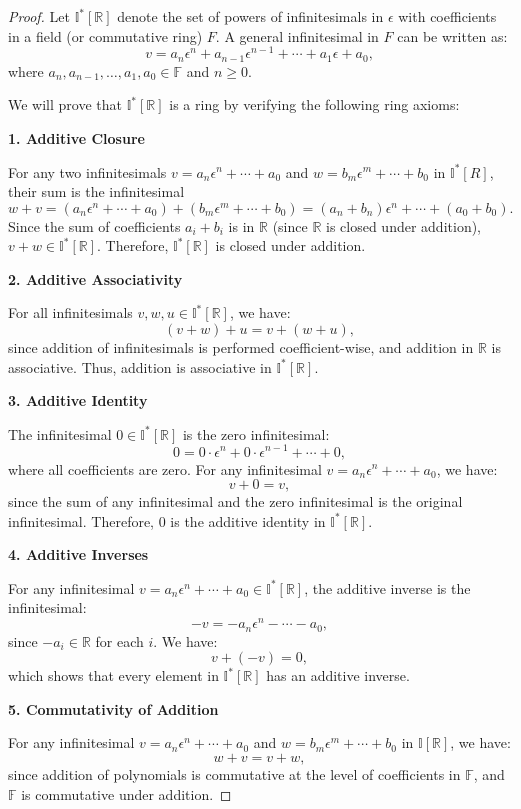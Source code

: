 \documentclass[10pt, oneside]{article}
\newcommand{\R}{\mathbb{R}}
\newcommand{\I}{\mathbb{I}}
\begin{document}
\begin{proof}
    Let \( \I^{*} [\R] \) denote the set of powers of infinitesimals in \( \epsilon \) with coefficients in a field (or commutative ring) \( F\). A general infinitesimal in \( F\) can be written as:
\[
v = a_n \epsilon^n + a_{n-1} \epsilon^{n-1} + \cdots + a_1 \epsilon + a_0,
\]
where \( a_n, a_{n-1}, \dots, a_1, a_0 \in \mathbb{F} \) and \( n \geq 0 \).

We will prove that \( \I^{*}[\R] \) is a ring by verifying the following ring axioms:

\textbf{1. Additive Closure}

For any two infinitesimals \( v = a_n \epsilon^n + \cdots + a_0 \) and \( w = b_m \epsilon^m + \cdots + b_0 \) in \( \I^{*}[R] \), their sum is the infinitesimal
\[
w + v = (a_n \epsilon^n + \cdots + a_0) + (b_m \epsilon^m + \cdots + b_0) = (a_n + b_n) \epsilon^n + \cdots + (a_0 + b_0).
\]
Since the sum of coefficients \( a_i + b_i \) is in \( \R \) (since \( \R \) is closed under addition), \( v + w \in \I^{*}[\R] \). Therefore, \( \I^{*}[\R] \) is closed under addition.

\textbf{2. Additive Associativity}

For all infinitesimals \( v, w, u \in \I^{*}[\R] \), we have:
\[
(v + w) + u = v + (w + u),
\]
since addition of infinitesimals is performed coefficient-wise, and addition in \( \R \) is associative. Thus, addition is associative in \( \I^{*}[\R] \).

\textbf{3. Additive Identity}

The infinitesimal \( 0 \in \I^{*}[\R] \) is the zero infinitesimal:
\[
0 = 0 \cdot \epsilon^n + 0 \cdot \epsilon^{n-1} + \cdots + 0,
\]
where all coefficients are zero. For any infinitesimal \( v = a_n \epsilon^n + \cdots + a_0 \), we have:
\[
v + 0 = v,
\]
since the sum of any infinitesimal and the zero infinitesimal is the original infinitesimal. Therefore, \( 0 \) is the additive identity in \( \I^{*}[\R] \).

\textbf{4. Additive Inverses}

For any infinitesimal \( v = a_n \epsilon^n + \cdots + a_0 \in \I^{*}[\R] \), the additive inverse is the infinitesimal:
\[
- v = -a_n \epsilon^n - \cdots - a_0,
\]
since \( -a_i \in \R \) for each \( i \). We have:
\[
v + (-v) = 0,
\]
which shows that every element in \( \I^{*}[\R] \) has an additive inverse.

\textbf{5. Commutativity of Addition}

For any infinitesimal \( v = a_n \epsilon^n + \cdots + a_0 \) and \( w = b_m \epsilon^m + \cdots + b_0 \) in \( \I[\R] \), we have:
\[
w + v = v + w,
\]
since addition of polynomials is commutative at the level of coefficients in \( \mathbb{F} \), and \( \mathbb{F} \) is commutative under addition.


\end{proof}
\end{document}
